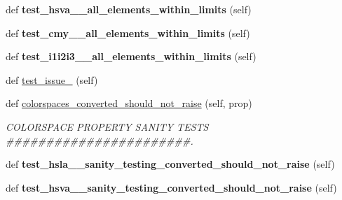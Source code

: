 \begin{DoxyCompactItemize}
def {\bfseries test\+\_\+hsva\+\_\+\+\_\+all\+\_\+elements\+\_\+within\+\_\+limits} (self)
\item 
\mbox{\label{classpygame_1_1tests_1_1color__test_1_1_color_type_test_a66b1fbf020fb11f7f1925739baaa6b7b}} 
def {\bfseries test\+\_\+cmy\+\_\+\+\_\+all\+\_\+elements\+\_\+within\+\_\+limits} (self)
\item 
\mbox{\label{classpygame_1_1tests_1_1color__test_1_1_color_type_test_aa776060fcf5d07261bb73086429a3c3f}} 
def {\bfseries test\+\_\+i1i2i3\+\_\+\+\_\+all\+\_\+elements\+\_\+within\+\_\+limits} (self)
\item 
def \hyperlink{classpygame_1_1tests_1_1color__test_1_1_color_type_test_af71b0b1864459c4c0af931dece53c73b}{test\+\_\+issue\+\_} (self)
\item 
\mbox{\label{classpygame_1_1tests_1_1color__test_1_1_color_type_test_a2c64f2a330c78acfba456ec2c795112c}} 
def \hyperlink{classpygame_1_1tests_1_1color__test_1_1_color_type_test_a2c64f2a330c78acfba456ec2c795112c}{colorspaces\+\_\+converted\+\_\+should\+\_\+not\+\_\+raise} (self, prop)
\begin{DoxyCompactList}\small\item\em C\+O\+L\+O\+R\+S\+P\+A\+CE P\+R\+O\+P\+E\+R\+TY S\+A\+N\+I\+TY T\+E\+S\+TS \#\#\#\#\#\#\#\#\#\#\#\#\#\#\#\#\#\#\#\#\#\#\#. \end{DoxyCompactList}\item 
\mbox{\label{classpygame_1_1tests_1_1color__test_1_1_color_type_test_ad6f13e0cbd35c61bcd91c13a1e72baca}} 
def {\bfseries test\+\_\+hsla\+\_\+\+\_\+sanity\+\_\+testing\+\_\+converted\+\_\+should\+\_\+not\+\_\+raise} (self)
\item 
\mbox{\label{classpygame_1_1tests_1_1color__test_1_1_color_type_test_a53a44442a65b3a0459ce4e8c3fcad834}} 
def {\bfseries test\+\_\+hsva\+\_\+\+\_\+sanity\+\_\+testing\+\_\+converted\+\_\+should\+\_\+not\+\_\+raise} (self)
\item 
\mbox{\label{classpygame_1_1tests_1_1color__test_1_1_color_type_test_ae5d87f20c0b5dcdecd273442033d79d1}} 

\end{DoxyCompactItemize}
